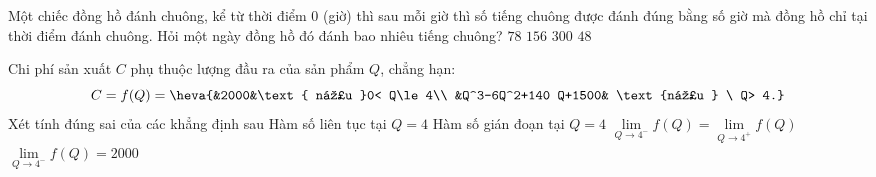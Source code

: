 \begin{ex}%
	Một chiếc đồng hồ đánh  chuông, kể từ thời điểm $0$ (giờ) thì sau mỗi giờ thì số tiếng chuông được đánh đúng bằng số giờ mà đồng hồ chỉ tại thời điểm đánh chuông. Hỏi một ngày đồng hồ đó đánh bao nhiêu tiếng chuông?
	\choice 
		{ $78$} 
		{  $156$}
		{  \True $300$}
		{  $48$}
\end{ex}



\begin{ex}%
  Chi phí sản xuất $C$ phụ thuộc lượng đầu ra của sản phẩm $Q$,
 chẳng hạn:  $$C=f(Q)= \heva{&2000&\text{ nếu }0< Q\le 4\\ &Q^3-6Q^2+140 Q+1500& \text{nếu } \ Q> 4.}$$
 Xét  tính đúng sai của các khẳng định sau
 \choiceTF 
  {Hàm số liên  tục tại $Q=4$}
  {\True Hàm số  gián đoạn tại $Q=4$}
  {$\lim\limits_{Q\to  4^-}f(Q)= \lim\limits_{Q\to 4^+}f(Q)$}
  {\True $ \lim\limits_{Q\to 4^-}f(Q)=2000$} 
\end{ex}


